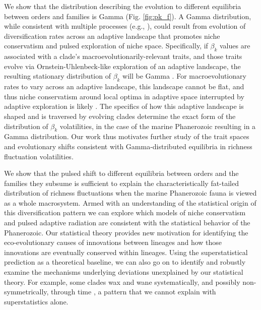 \documentclass[12pt]{article}
\let\citep=\cite
\begin{document}
We show that the distribution describing the evolution to different
equilibria between orders and families is Gamma (Fig. \ref{fig:pk_f}).
A Gamma distribution, while consistent with multiple processes (e.g.,
\citep{cir1985}), could result from evolution of diversification rates
across an adaptive landscape that promotes niche conservatism and
pulsed exploration of niche space.  Specifically, if $\beta_k$ values
are associated with a clade's macroevolutionarily-relevant traits, and
those traits evolve via Ornstein-Uhlenbeck-like exploration of an
adaptive landscape, the resulting stationary distribution of $\beta_k$
will be Gamma \citep{cir1985, butler2004}.  For macroevolutionary
rates to vary across an adaptive landscape, this landscape cannot be
flat, and thus niche conservatism around local optima in adaptive
space interrupted by adaptive exploration is likely
\citep{newman1985adaptive, gavrilets2004book}. The specifics of how
this adaptive landscape is shaped and is traversed by evolving clades
determine the exact form of the distribution of $\beta_k$
volatilities, in the case of the marine Phanerozoic resulting in a
Gamma distribution. Our work thus motivates further study of the trait
spaces and evolutionary shifts consistent with Gamma-distributed
equilibria in richness fluctuation volatilities.

We show that the pulsed shift to different equilibria between orders
and the families they subsume is sufficient to explain the
characteristically fat-tailed distribution of richness fluctuations
when the marine Phanerozoic fauna is viewed as a whole macrosystem.
Armed with an understanding of the statistical origin of this
diversification pattern we can explore which models of niche
conservatism and pulsed adaptive radiation are consistent with the
statistical behavior of the Phanerozoic. Our statistical theory
provides new motivation for identifying the eco-evolutionary causes of
innovations between lineages and how those innovations are eventually
conserved within lineages. Using the superstatistical prediction as a
theoretical baseline, we can also go on to identify and robustly
examine the mechanisms underlying deviations unexplained by our
statistical theory. For example, some clades wax and wane
systematically, and possibly non-symmetrically, through time
\citep{liow2007, foote2008paleobiol, quental2013}, a pattern that we
cannot explain with superstatistics alone.
\end{document}

